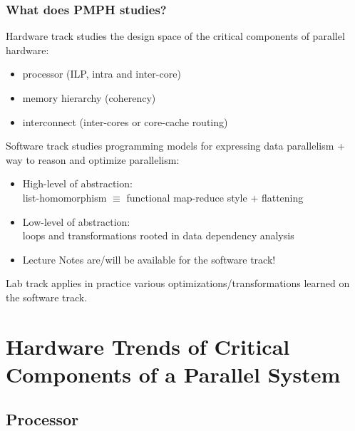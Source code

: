 \documentclass{beamer}
\begin{document}
\begin{frame}[fragile]
\frametitle{What does PMPH studies?}

Hardware track studies the design space of the critical components of parallel hardware:\medskip
    \begin{itemize}
        \item processor (ILP, intra and inter-core)\smallskip
        \item memory hierarchy (coherency)\smallskip
        \item interconnect (inter-cores or core-cache routing)\smallskip
    \end{itemize}
\bigskip
\pause

Software track studies programming models for expressing data parallelism + way to reason and optimize parallelism:\medskip
    \begin{itemize}
        \item High-level of abstraction:\\ 
                list-homomorphism $\equiv$ functional map-reduce style + flattening\smallskip
        \item Low-level of abstraction:\\
                loops and transformations rooted in data dependency analysis\smallskip
        \item Lecture Notes are/will be available for the software track!
    \end{itemize}
\bigskip
\pause

Lab track applies in practice various optimizations/transformations learned on the software track.

\end{frame}



\section{Hardware Trends of Critical Components of a Parallel System}

\begin{frame}[fragile]
	\tableofcontents[currentsection]
\end{frame}

\subsection{Processor}
\end{document}
